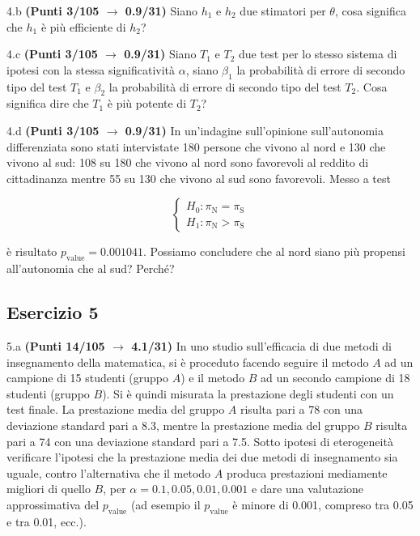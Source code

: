 \documentclass[
  11pt,
]{book}
\theoremstyle{mytheoremstyle}
\theoremstyle{mydefstyle}
\begin{document}
4.b \textbf{(Punti 3/105 \(\rightarrow\) 0.9/31)} Siano \(h_1\) e \(h_2\) due stimatori per \(\theta\), cosa significa che \(h_1\) è più efficiente di \(h_2\)?

4.c \textbf{(Punti 3/105 \(\rightarrow\) 0.9/31)} Siano \(T_1\) e \(T_2\) due test per lo stesso sistema di ipotesi con la stessa significatività \(\alpha\), siano \(\beta_1\) la probabilità di errore di secondo tipo del test \(T_1\) e \(\beta_2\) la probabilità di errore di secondo tipo del test \(T_2\). Cosa significa dire che \(T_1\) è più potente di \(T_2\)?

4.d \textbf{(Punti 3/105 \(\rightarrow\) 0.9/31)} In un'indagine sull'opinione sull'autonomia differenziata sono stati intervistate 180 persone che vivono al nord e 130 che vivono al sud: 108 su 180 che vivono al nord sono favorevoli al reddito di cittadinanza mentre 55 su 130 che vivono al sud sono favorevoli.
Messo a test

\[
\begin{cases}
   H_0: \pi_\text{N} = \pi_\text{S} \\
   H_1: \pi_\text{N} > \pi_\text{S} 
\end{cases}
\]

è risultato \(p_{\text{value}} =0.001041\). Possiamo concludere che al nord siano più propensi all'autonomia che al sud? Perché?

\subsection{Esercizio 5}\label{esercizio-5-39}

5.a \textbf{(Punti 14/105 \(\rightarrow\) 4.1/31)} In uno studio sull'efficacia di due metodi di insegnamento della matematica, si è proceduto facendo seguire il metodo \(A\) ad un campione di 15 studenti (gruppo \(A\)) e il metodo \(B\) ad un secondo campione di 18 studenti (gruppo \(B\)). Si è quindi misurata la prestazione degli studenti con un test finale. La prestazione media del gruppo \(A\) risulta pari a 78 con una deviazione standard pari a 8.3, mentre la prestazione media del gruppo \(B\) risulta pari a 74 con una deviazione standard pari a 7.5. Sotto ipotesi di eterogeneità verificare l'ipotesi che la prestazione media dei due metodi di insegnamento sia uguale, contro l'alternativa che il metodo \(A\) produca prestazioni mediamente migliori di quello \(B\), per \(\alpha=0.1,0.05,0.01,0.001\) e dare una valutazione approssimativa del \(p_\text{value}\) (ad esempio il \(p_\text{value}\) è minore di 0.001, compreso tra 0.05 e tra 0.01, ecc.).
\end{document}
